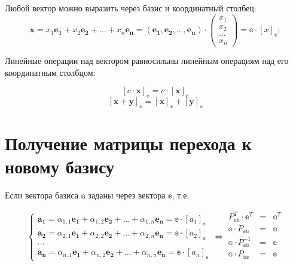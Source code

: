 Любой вектор можно выразить через базис и координатный столбец: 
$$
	\boldsymbol{x} = x_1\boldsymbol{e_1} + x_2\boldsymbol{e_2} + \dots + x_n\boldsymbol{e_n} = (\boldsymbol{e_1}, \boldsymbol{e_2}, \dots, \boldsymbol{e_n}) \cdot 
	\begin{pmatrix}
		x_1\\
		x_2\\
		\dots\\
		x_n
	\end{pmatrix} = \mathbb{e}\cdot [x]_\mathbb{e}; 
$$

Линейные операции над вектором равносильны линейным операциям над его координатным столбцом:

$$ [c\cdot \boldsymbol{x}]_\mathbb{e} = c\cdot [\boldsymbol{x}]_\mathbb{e} $$
$$ [\boldsymbol{x} + \boldsymbol{y}]_\mathbb{e} = [\boldsymbol{x}]_\mathbb{e} + [\boldsymbol{y}]_\mathbb{e} $$

\section{Получение матрицы перехода к новому базису}

Если вектора базиса $\mathbb{a}$ заданы через вектора $\mathbb{e}$, т.е.

\begin{equation*} 
	\begin{cases}
		\boldsymbol{a_1} = \alpha_{1,1}\boldsymbol{e_1} + \alpha_{1,2}\boldsymbol{e_2} + \dots + \alpha_{1,n}\boldsymbol{e_n} = \mathbb{e} \cdot [a_1]_\mathbb{e} \\
		\boldsymbol{a_2} = \alpha_{2,1}\boldsymbol{e_1} + \alpha_{2,2}\boldsymbol{e_2} + \dots + \alpha_{2,n}\boldsymbol{e_n} = \mathbb{e} \cdot [a_2]_\mathbb{e} \\
		\dots \\
		\boldsymbol{a_n} = \alpha_{n,1}\boldsymbol{e_1} + \alpha_{n,2}\boldsymbol{e_2} + \dots + \alpha_{n,n}\boldsymbol{e_n} = \mathbb{e} \cdot [a_n]_\mathbb{e}
	\end{cases}
	\Leftrightarrow
	\begin{matrix}
		P_\mathbb{ea}^T \cdot \mathbb{e}^T& =& \mathbb{a}^T \\
		\mathbb{e} \cdot P_\mathbb{ea}& =& \mathbb{a}\\
		\mathbb{a} \cdot P_\mathbb{ea}^{-1}& =& \mathbb{e}\\
		\mathbb{a} \cdot P_\mathbb{ae}& =& \mathbb{e}\\
	\end{matrix}
\end{equation*} 

